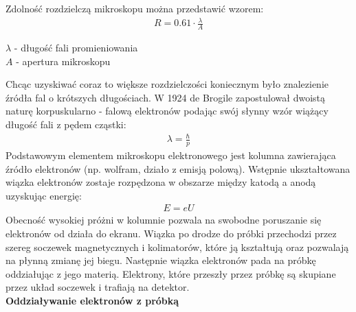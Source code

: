 \documentclass{article}
\begin{document}
\begin{enumerate}
Zdolność rozdzielczą mikroskopu można przedstawić wzorem:
\begin{gather*}
R=0.61\cdot \frac{\lambda}{A}
\end{gather*}
\begin{flushright}
\small
$\lambda$ - długość fali promieniowania\\
$ A$ - apertura mikroskopu
\end{flushright}
Chcąc uzyskiwać coraz to większe rozdzielczości koniecznym było znalezienie źródła fal o krótszych długościach. W 1924 de Brogile zapostulował dwoistą naturę korpuskularno - falową elektronów podając swój słynny wzór wiążący długość fali z pędem cząstki:
\begin{gather*}
\lambda=\frac{\hbar}{p}
\end{gather*}
Podstawowym elementem mikroskopu elektronowego jest kolumna zawierająca źródło elektronów (np. wolfram, działo z emisją polową). Wstępnie ukształtowana wiązka elektronów zostaje rozpędzona w obszarze między katodą a anodą uzyskując energię:
\begin{gather*}
E=eU
\end{gather*}
Obecność wysokiej próżni w kolumnie pozwala na swobodne poruszanie się elektronów od działa do ekranu. Wiązka po drodze do próbki przechodzi przez szereg soczewek magnetycznych i kolimatorów, które ją kształtują oraz pozwalają na płynną zmianę jej biegu. Następnie wiązka elektronów pada na próbkę oddziałując z jego materią. Elektrony, które przeszły przez próbkę są skupiane przez układ soczewek i trafiają  na detektor. \\

{\bf Oddziaływanie elektronów z próbką}\\


\end{enumerate}
\end{document}
